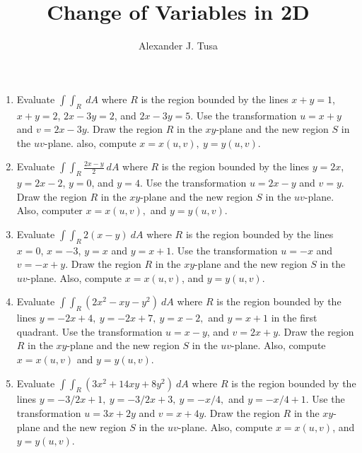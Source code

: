 \documentclass[12pt,letterpaper]{article}
\author{Alexander J. Tusa}
\title{Change of Variables in 2D}
\theoremstyle{case}
\theoremstyle{definition}
\begin{document}
	\maketitle
	\begin{enumerate}
		\item Evaluate $\displaystyle\int \int_R\ dA$ where $R$ is the region bounded by the lines $x+y=1$, $x+y=2$, $2x-3y=2$, and $2x-3y=5$. Use the transformation $u=x+y$ and $v=2x-3y$. Draw the region $R$ in the $xy$-plane and the new region $S$ in the $uv$-plane. also, compute $x=x(u,v),\ y=y(u,v)$.

		\item Evaluate $\displaystyle\int\int_R \frac{2x-y}{2}\ dA$ where $R$ is the region bounded by the lines $y=2x$, $y=2x-2$, $y=0$, and $y=4$. Use the transformation $u=2x-y$ and $v=y$. Draw the region $R$ in the $xy$-plane and the new region $S$ in the $uv$-plane. Also, computer $x=x(u,v),$ and $y=y(u,v)$.
		
		\item Evaluate $\displaystyle\int\int_R 2(x-y)\ dA$ where $R$ is the region bounded by the lines $x=0$, $x=-3$, $y=x$ and $y=x+1$. Use the transformation $u=-x$ and $v=-x+y$. Draw the region $R$ in the $xy$-plane and the new region $S$ in the $uv$-plane. Also, compute $x=x(u,v)$, and $y=y(u,v)$.
		
		\item Evaluate $\displaystyle\int\int_R (2x^2-xy-y^2)\ dA$ where $R$ is the region bounded by the lines $y=-2x+4,\ y=-2x+7,\ y=x-2,$ and $y=x+1$ in the first quadrant. Use the transformation $u=x-y$, and $v=2x+y$. Draw the region $R$ in the $xy$-plane and the new region $S$ in the $uv$-plane. Also, compute $x=x(u,v)$ and $y=y(u,v)$.
		
		\item Evaluate $\displaystyle\int\int_R (3x^2+14xy+8y^2)\ dA$ where $R$ is the region bounded by the lines $y=-3/2x+1,\ y=-3/2x+3,\ y=-x/4,$ and $y=-x/4+1$. Use the transformation $u=3x+2y$ and $v=x+4y$. Draw the region $R$ in the $xy$-plane and the new region $S$ in the $uv$-plane. Also, compute $x=x(u,v)$, and $y=y(u,v)$.
	\end{enumerate}
\end{document}

